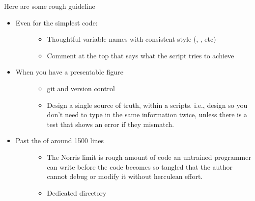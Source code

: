 \documentclass[letterpaper,10pt,english]{sphinxmanual}
\begin{document}
\sphinxAtStartPar
Here are some rough guideline
\begin{itemize}
\item {} \begin{description}
\item[{Even for the simplest code:}] \leavevmode\begin{itemize}
\item {} 
\sphinxAtStartPar
Thoughtful variable names with consistent style (, , etc)

\item {} 
\sphinxAtStartPar
Comment at the top that says what the script tries to achieve

\end{itemize}

\end{description}

\item {} \begin{description}
\item[{When you have a presentable figure}] \leavevmode\begin{itemize}
\item {} 
\sphinxAtStartPar
git and version control

\item {} 
\sphinxAtStartPar
Design a single source of truth, within a scripts. i.e., design so you don’t need to type in the same information twice, unless there is a test that shows an error if they mismatch.

\end{itemize}

\end{description}

\item {} \begin{description}
\item[{Past the  of around 1500 lines}] \leavevmode\begin{itemize}
\item {} 
\sphinxAtStartPar
The Norris limit is rough amount of code an untrained programmer can write before the code becomes so tangled that the author cannot debug or modify it without herculean effort.

\item {} 
\sphinxAtStartPar
Dedicated  directory


\end{itemize}
\end{description}
\end{itemize}
\end{document}
